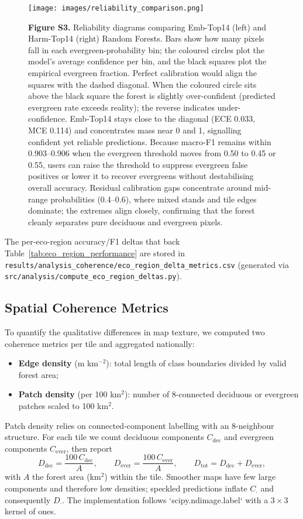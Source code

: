 \documentclass[utf8]{frontiers_suppmat}
\begin{document}
\begin{figure}[H]
    \centering
    \texttt{[image: images/reliability\_comparison.png]}
    \caption{\textbf{Figure S3.} Reliability diagrams comparing Emb-Top14 (left) and Harm-Top14 (right) Random Forests. Bars show how many pixels fall in each evergreen-probability bin; the coloured circles plot the model’s average confidence per bin, and the black squares plot the empirical evergreen fraction. Perfect calibration would align the squares with the dashed diagonal. When the coloured circle sits above the black square the forest is slightly over-confident (predicted evergreen rate exceeds reality); the reverse indicates under-confidence. Emb-Top14 stays close to the diagonal (ECE 0.033, MCE 0.114) and concentrates mass near 0 and 1, signalling confident yet reliable predictions. Because macro-F1 remains within 0.903–0.906 when the evergreen threshold moves from 0.50 to 0.45 or 0.55, users can raise the threshold to suppress evergreen false positives or lower it to recover evergreens without destabilising overall accuracy. Residual calibration gaps concentrate around mid-range probabilities (0.4–0.6), where mixed stands and tile edges dominate; the extremes align closely, confirming that the forest cleanly separates pure deciduous and evergreen pixels.}
    \label{fig:reliability}
\end{figure}

The per-eco-region accuracy/F1 deltas that back Table~\ref{tab:eco_region_performance} are stored in \texttt{results/analysis\_coherence/eco\_region\_delta\_metrics.csv} (generated via \texttt{src/analysis/compute\_eco\_region\_deltas.py}).

\subsection{Spatial Coherence Metrics}

To quantify the qualitative differences in map texture, we computed two coherence metrics per tile and aggregated nationally:
\begin{itemize}
    \item \textbf{Edge density} (m km$^{-2}$): total length of class boundaries divided by valid forest area;
    \item \textbf{Patch density} (per 100 km$^{2}$): number of 8-connected deciduous or evergreen patches scaled to 100 km$^{2}$.
\end{itemize}

Patch density relies on connected-component labelling with an 8-neighbour structure. For each tile we count deciduous components \(C_{\text{dec}}\) and evergreen components \(C_{\text{ever}}\), then report
\begin{equation*}
    D_{\text{dec}} = \frac{100\,C_{\text{dec}}}{A}, \qquad
    D_{\text{ever}} = \frac{100\,C_{\text{ever}}}{A}, \qquad
    D_{\text{tot}} = D_{\text{dec}} + D_{\text{ever}},
\end{equation*}
with \(A\) the forest area (km$^2$) within the tile. Smoother maps have few large components and therefore low densities; speckled predictions inflate \(C_{\cdot}\) and consequently \(D_{\cdot}\). The implementation follows `scipy.ndimage.label` with a \(3\times3\) kernel of ones.
\end{document}
